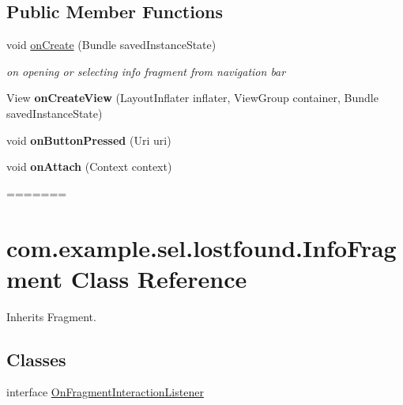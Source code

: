\subsection*{Public Member Functions}
\begin{DoxyCompactItemize}
\item 
void \hyperlink{classcom_1_1example_1_1sel_1_1lostfound_1_1InfoFragment_a1a9382b4b0ceacfc464559a897fa7656}{on\-Create} (Bundle saved\-Instance\-State)
\begin{DoxyCompactList}\small\item\em on opening or selecting info fragment from navigation bar \end{DoxyCompactList}\item 
\hypertarget{classcom_1_1example_1_1sel_1_1lostfound_1_1InfoFragment_adb5e6a68883e5b4cb236e0e2e221d7f4}{View {\bfseries on\-Create\-View} (Layout\-Inflater inflater, View\-Group container, Bundle saved\-Instance\-State)}\label{classcom_1_1example_1_1sel_1_1lostfound_1_1InfoFragment_adb5e6a68883e5b4cb236e0e2e221d7f4}

\item 
\hypertarget{classcom_1_1example_1_1sel_1_1lostfound_1_1InfoFragment_a20ae678d3072262f318a083241372871}{void {\bfseries on\-Button\-Pressed} (Uri uri)}\label{classcom_1_1example_1_1sel_1_1lostfound_1_1InfoFragment_a20ae678d3072262f318a083241372871}

\item 
\hypertarget{classcom_1_1example_1_1sel_1_1lostfound_1_1InfoFragment_a07cb9a9ac26dec9f20abce73c04f92e1}{void {\bfseries on\-Attach} (Context context)}\label{classcom_1_1example_1_1sel_1_1lostfound_1_1InfoFragment_a07cb9a9ac26dec9f20abce73c04f92e1}
=======
\hypertarget{classcom_1_1example_1_1sel_1_1lostfound_1_1InfoFragment}{\section{com.\-example.\-sel.\-lostfound.\-Info\-Fragment \-Class \-Reference}
\label{classcom_1_1example_1_1sel_1_1lostfound_1_1InfoFragment}
}


\-Inherits \-Fragment.

\subsection*{\-Classes}
\begin{DoxyCompactItemize}
\item 
interface \hyperlink{interfacecom_1_1example_1_1sel_1_1lostfound_1_1InfoFragment_1_1OnFragmentInteractionListener}{\-On\-Fragment\-Interaction\-Listener}
\end{DoxyCompactItemize}

\end{DoxyCompactItemize}
